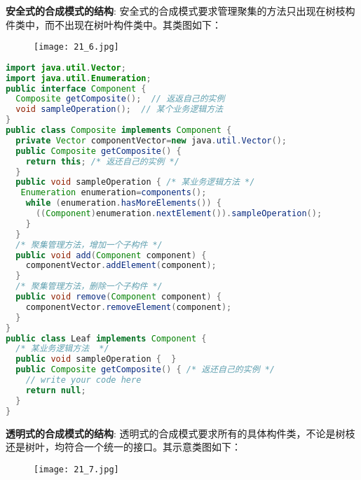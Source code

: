 \documentclass[../main.tex]{subfiles}
\begin{document}
\textbf{安全式的合成模式的结构}:
安全式的合成模式要求管理聚集的方法只出现在树枝构件类中，而不出现在树叶构件类中。其类图如下：
\begin{figure}[H]
  \texttt{[image: 21\_6.jpg]}
\end{figure}
%
\begin{lstlisting}[language=java]
import java.util.Vector;
import java.util.Enumeration;
public interface Component {
  Composite getComposite();  // 返返自己的实例
  void sampleOperation();  // 某个业务逻辑方法
}
public class Composite implements Component {
  private Vector componentVector=new java.util.Vector();
  public Composite getComposite() {
    return this; /* 返还自己的实例 */
  }
  public void sampleOperation { /* 某业务逻辑方法 */
   Enumeration enumeration=components();
    while (enumeration.hasMoreElements()) {
      ((Component)enumeration.nextElement()).sampleOperation();
    }
  }
  /* 聚集管理方法，增加一个子构件 */
  public void add(Component component) {
    componentVector.addElement(component);
  }
  /* 聚集管理方法，删除一个子构件 */
  public void remove(Component component) {
    componentVector.removeElement(component);
  }
}
public class Leaf implements Component {
  /* 某业务逻辑方法  */
  public void sampleOperation {  }
  public Composite getComposite() { /* 返还自己的实例 */
    // write your code here
    return null;
  }
}
\end{lstlisting}
%
\textbf{透明式的合成模式的结构}:
透明式的合成模式要求所有的具体构件类，不论是树枝还是树叶，均符合一个统一的接口。其示意类图如下：
\begin{figure}[H]
  \texttt{[image: 21\_7.jpg]}
\end{figure}
%
\end{document}
